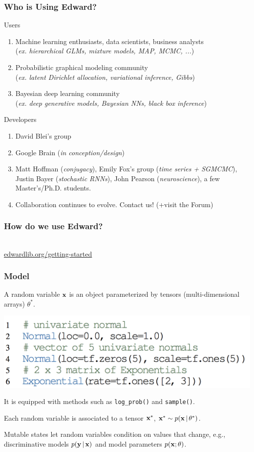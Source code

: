\documentclass[10pt,
               xcolor={usenames,dvipsnames},
               hyperref={colorlinks,linktoc=all,citecolor=Plum,linkcolor=MidnightBlue,urlcolor=MidnightBlue},noamssymb]{beamer}
\begin{document}
\begin{frame}
\frametitle{Who is Using Edward?}
{\large Users}
\begin{enumerate}
\item
Machine learning enthusiasts, data scientists, business analysts \\
(\emph{ex. hierarchical GLMs, mixture models, MAP, MCMC, ...})
\item
Probabilistic graphical modeling community \\
(\emph{ex. latent Dirichlet allocation, variational inference, Gibbs})
\item
Bayesian deep learning community \\
(\emph{ex. deep generative models, Bayesian NNs, black box inference})
\end{enumerate}

{\large Developers}
\begin{enumerate}
\item
David Blei's group
\item
Google Brain
(\emph{in conception/design})
\item
Matt Hoffman (\emph{conjugacy}),
Emily Fox's group
(\emph{time series + SGMCMC}),
Justin Bayer (\emph{stochastic RNNs}),
John Pearson (\emph{neuroscience}),
a few Master's/Ph.D. students.
\item
Collaboration continues to evolve. Contact us! (+visit the Forum)
\end{enumerate}
\end{frame}

\begin{frame}
\frametitle{How do we use Edward?}
\vspace{10ex}
\begin{center}
\gray{\Large [Demo]} \\[3ex]
{\large \url{edwardlib.org/getting-started}}
\end{center}
\end{frame}

\begin{frame}
\frametitle{Model}
A random variable $\boldsymbol{\mathbf{x}}$ is an object parameterized by tensors
(multi-dimensional arrays) $\theta^*$.

\vspace{-1.0ex}
\includegraphics[height=0.20\textwidth]{img/random_variables.png}

It is equipped with methods such as \texttt{log\_prob()} and \texttt{sample()}.

Each random variable is associated to a tensor $\boldsymbol{\mathbf{x}}^*$, $\boldsymbol{\mathbf{x}}^*\sim p(\boldsymbol{\mathbf{x}}\,|\,\theta^*)$.

Mutable states let random variables condition on values that
change, e.g., discriminative models $p(\boldsymbol{\mathbf{y}}\,|\,\boldsymbol{\mathbf{x}})$ and model
parameters $p(\boldsymbol{\mathbf{x}}; \theta)$.
\end{frame}
\end{document}
